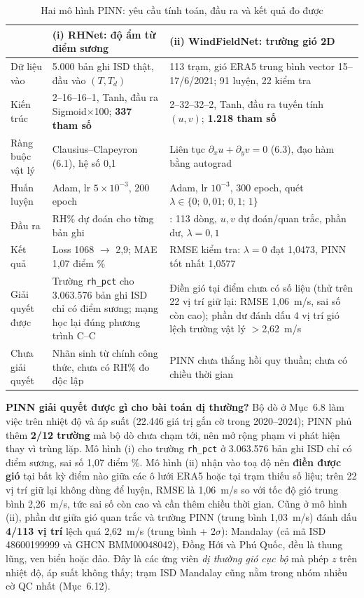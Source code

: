 \documentclass[12pt,a4paper]{report}
\begin{document}
\begin{table}[H]
\centering\footnotesize
\caption{Hai mô hình PINN: yêu cầu tính toán, đầu ra và kết quả đo được}
\label{tab:pinn-summary}
\begin{tabular}{@{}L{2.6cm}L{5.6cm}L{5.6cm}@{}}
\toprule
& \textbf{(i) RHNet: độ ẩm từ điểm sương} & \textbf{(ii) WindFieldNet: trường gió 2D} \\
\midrule
Dữ liệu vào & 5.000 bản ghi ISD thật, đầu vào $(T, T_d)$ & 113 trạm, gió ERA5 trung bình vector 15--17/6/2021; 91 luyện, 22 kiểm tra \\
Kiến trúc & 2--16--16--1, Tanh, đầu ra Sigmoid$\times$100; \textbf{337 tham số} & 2--32--32--2, Tanh, đầu ra tuyến tính $(u,v)$; \textbf{1.218 tham số} \\
Ràng buộc vật lý & Clausius--Clapeyron (6.1), hệ số 0,1 & Liên tục $\partial_x u + \partial_y v = 0$ (6.3), đạo hàm bằng autograd \\
Huấn luyện & Adam, lr $5\times10^{-3}$, 200 epoch & Adam, lr $10^{-3}$, 300 epoch, quét $\lambda \in \{0;\,0{,}01;\,0{,}1;\,1\}$ \\
Đầu ra & RH\% dự đoán cho từng bản ghi & : 113 dòng, $u,v$ dự đoán/quan trắc, phần dư, $\lambda=0{,}1$ \\
Kết quả & Loss 1068 $\to$ 2,9; MAE 1,07 điểm \% & RMSE kiểm tra: $\lambda=0$ đạt 1,0473, PINN tốt nhất 1,0577 \\
Giải quyết được & Trường \texttt{rh\_pct} cho 3.063.576 bản ghi ISD chỉ có điểm sương; mạng học lại đúng phương trình C--C & Điền gió tại điểm chưa có số liệu (thử trên 22 vị trí giữ lại: RMSE 1,06~m/s, sai số còn cao); phần dư đánh dấu 4 vị trí gió lệch trường vật lý $>$2,62~m/s \\
Chưa giải quyết & Nhãn sinh từ chính công thức, chưa có RH\% đo độc lập & PINN chưa thắng hồi quy thuần; chưa có chiều thời gian \\
\bottomrule
\end{tabular}
\end{table}

\textbf{PINN giải quyết được gì cho bài toán dị thường?} Bộ dò ở Mục~6.8 làm việc trên nhiệt độ và áp suất
(22.446 giá trị gắn cờ trong 2020--2024); PINN phủ thêm \textbf{2/12 trường} mà bộ dò chưa chạm tới, nên mở
rộng phạm vi phát hiện thay vì trùng lặp. Mô hình (i) cho trường \texttt{rh\_pct} ở 3.063.576 bản ghi ISD chỉ có
điểm sương, sai số 1,07 điểm \%. Mô hình (ii) nhận vào toạ độ nên \textbf{điền được gió} tại bất kỳ điểm nào
giữa các ô lưới ERA5 hoặc tại trạm thiếu số liệu; trên 22 vị trí giữ lại không dùng để luyện, RMSE là 1,06~m/s
so với tốc độ gió trung bình 2,26~m/s, tức sai số còn cao và cần thêm chiều thời gian. Cũng ở mô hình (ii), phần dư giữa gió quan trắc và trường PINN (trung bình
1,03~m/s) đánh dấu \textbf{4/113 vị trí} lệch quá 2,62~m/s (trung bình + 2$\sigma$): Mandalay (cả mã ISD
48600199999 và GHCN BMM00048042), Đồng Hới và Phú Quốc, đều là thung lũng, ven biển hoặc đảo. Đây là các ứng
viên \emph{dị thường gió cục bộ} mà phép $z$ trên nhiệt độ, áp suất không thấy; trạm ISD Mandalay cũng nằm trong
nhóm nhiều cờ QC nhất (Mục~6.12).
\end{document}
